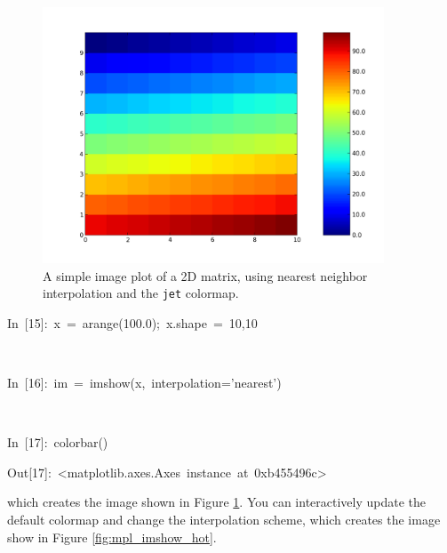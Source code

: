%
\begin{figure}
\begin{centering}
\includegraphics[width=4in]{fig/mpl_image_jet}
\par\end{centering}

\caption{\label{fig:mpl_imshow_jet}A simple image plot of a 2D matrix, using
nearest neighbor interpolation and the \texttt{jet} colormap.}

\end{figure}


\begin{lyxcode}
In~{[}15]:~x~=~arange(100.0);~x.shape~=~10,10

~

In~{[}16]:~im~=~imshow(x,~interpolation='nearest')

~

In~{[}17]:~colorbar()

Out{[}17]:~<matplotlib.axes.Axes~instance~at~0xb455496c>
\end{lyxcode}
which creates the image shown in Figure \ref{fig:mpl_imshow_jet}.
 You can interactively update the default colormap and change the
interpolation scheme, which creates the image show in Figure \ref{fig:mpl_imshow_hot}.

